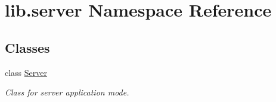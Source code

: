 \hypertarget{namespacelib_1_1server}{}\section{lib.\+server Namespace Reference}
\label{namespacelib_1_1server}
\subsection*{Classes}
\begin{DoxyCompactItemize}
\item 
class \hyperlink{classlib_1_1server_1_1_server}{Server}
\begin{DoxyCompactList}\small\item\em Class for server application mode. \end{DoxyCompactList}\end{DoxyCompactItemize}
